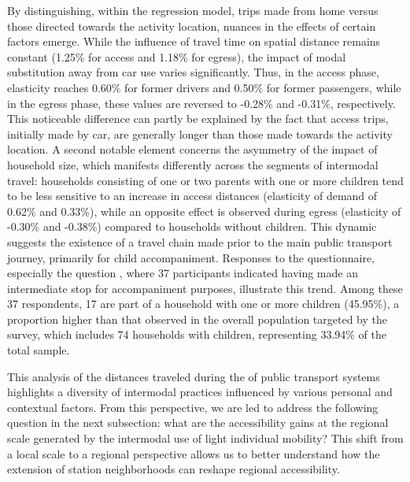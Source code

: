 \begin{refsegment}
By distinguishing, within the regression model, trips made from home versus those directed towards the activity location, nuances in the effects of certain factors emerge. While the influence of travel time on spatial distance remains constant (1.25\% for access and 1.18\% for egress), the impact of modal substitution away from car use varies significantly. Thus, in the access phase, elasticity reaches 0.60\% for former drivers and 0.50\% for former passengers, while in the egress phase, these values are reversed to -0.28\% and -0.31\%, respectively. This noticeable difference can partly be explained by the fact that access trips, initially made by car, are generally longer than those made towards the activity location. A second notable element concerns the asymmetry of the impact of household size, which manifests differently across the segments of intermodal travel: households consisting of one or two parents with one or more children tend to be less sensitive to an increase in access distances (elasticity of demand of 0.62\% and 0.33\%), while an opposite effect is observed during egress (elasticity of -0.30\% and -0.38\%) compared to households without children. This dynamic suggests the existence of a travel chain made prior to the main public transport journey, primarily for child accompaniment. Responses to the questionnaire, especially the question , where 37 participants indicated having made an intermediate stop for accompaniment purposes, illustrate this trend. Among these 37 respondents, 17 are part of a household with one or more children (45.95\%), a proportion higher than that observed in the overall population targeted by the survey, which includes 74 households with children, representing 33.94\% of the total sample.%

This analysis of the distances traveled during the  of public transport systems highlights a diversity of intermodal practices influenced by various personal and contextual factors. From this perspective, we are led to address the following question in the next subsection: what are the accessibility gains at the regional scale generated by the intermodal use of light individual mobility? This shift from a local scale to a regional perspective allows us to better understand how the extension of station neighborhoods can reshape regional accessibility.%
    
    \newpage

\end{refsegment}
